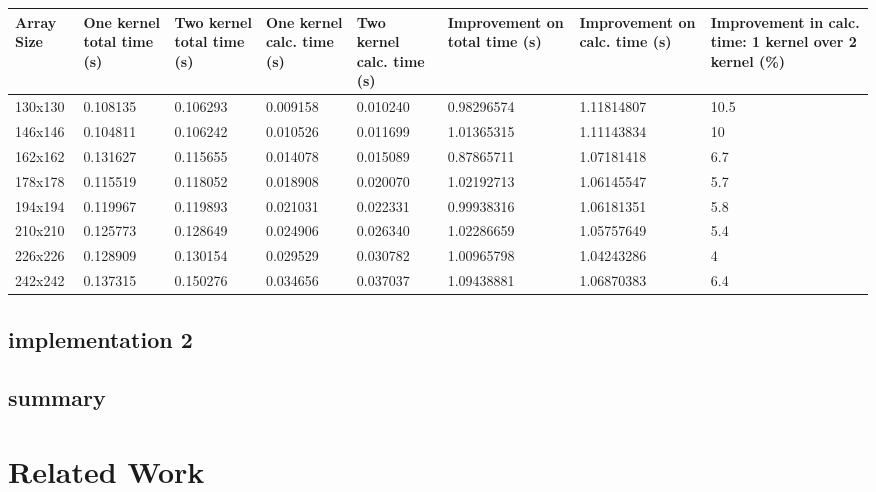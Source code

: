 \documentclass[11pt, twocolumn]{article}
\begin{document}
    \begin{center}
        \begin{tabular}{ | p{1.3cm} | p{1.5cm} | p{1.5cm} | p{1.6cm} | p{1.6cm} | p{2cm} | p{1.9cm} | p{2cm} | }
            \hline
            Array Size  & One kernel total time (s) & Two kernel total time (s) & One kernel calc. time (s) & Two kernel calc. time (s) & Improvement on total time (s) & Improvement on calc. time (s) & Improvement in calc. time: 1 kernel over 2 kernel (\%) \\ \hline
            130x130 & 0.108135    & 0.106293    & 0.009158    & 0.010240    & 0.98296574  & 1.11814807  & 10.5  \\
            146x146 & 0.104811    & 0.106242    & 0.010526    & 0.011699    & 1.01365315  & 1.11143834  & 10    \\
            162x162 & 0.131627    & 0.115655    & 0.014078    & 0.015089    & 0.87865711  & 1.07181418  & 6.7   \\
            178x178 & 0.115519    & 0.118052    & 0.018908    & 0.020070    & 1.02192713  & 1.06145547  & 5.7   \\
            194x194 & 0.119967    & 0.119893    & 0.021031    & 0.022331    & 0.99938316  & 1.06181351  & 5.8   \\
            210x210 & 0.125773    & 0.128649    & 0.024906    & 0.026340    & 1.02286659  & 1.05757649  & 5.4   \\
            226x226 & 0.128909    & 0.130154    & 0.029529    & 0.030782    & 1.00965798  & 1.04243286  & 4     \\
            242x242 & 0.137315    & 0.150276    & 0.034656    & 0.037037    & 1.09438881  & 1.06870383  & 6.4   \\
            \hline
        \end{tabular}
    \end{center}

    \subsection{implementation 2}
    \subsection{summary} %

\section{Related Work} %
\end{document}
